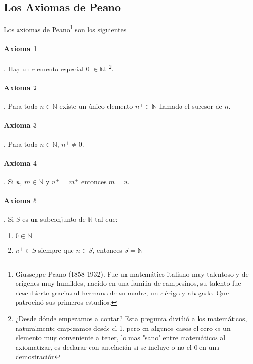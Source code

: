 \documentclass{article}
\begin{document}
\subsection{Los Axiomas de Peano}

Los axiomas de Peano\footnote{Giusseppe Peano (1858-1932). Fue un matemático italiano muy talentoso y de orígenes muy humildes, nacido en una familia de campesinos, su talento fue descubierto gracias al hermano de su madre, un clérigo y abogado. Que patrocinó sus primeros estudios.} son los siguientes\cite{tnumprincip_2004}

\paragraph{Axioma 1}. Hay un elemento especial 0 $\in \mathbb{N}$. \footnote{¿Desde dónde empezamos a contar? Esta pregunta dividió a los matemáticos, naturalmente empezamos desde el 1, pero en algunos casos el cero es un elemento muy conveniente a tener, lo mas "sano" entre matemáticos al axiomatizar, es declarar con antelación si se incluye o no el 0 en una demostración}.
\paragraph{Axioma 2}. Para todo $n \in \mathbb{N}$ existe un único elemento $n^+ \in \mathbb{N}$ llamado el sucesor de $n$.
\paragraph{Axioma 3}. Para todo $n \in \mathbb{N}$, $n^+ \neq 0$.
\paragraph{Axioma 4}. Si $n$, $m \in \mathbb{N}$ y $n^+ = m^+$ entonces $m = n$.
\paragraph{Axioma 5}. Si $S$ es un subconjunto de $\mathbb{N}$ tal que:
\begin{enumerate}
    \item $0 \in \mathbb{N}$
    \item $n^+ \in S$ siempre que $n \in S$, entonces $S = \mathbb{N}$
\end{enumerate}
\end{document}
